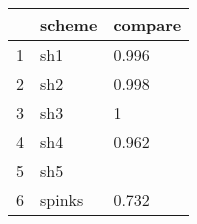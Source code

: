 \begin{table}[ht]
\centering
\begin{tabular}{rll}
  \hline
 & scheme & compare \\ 
  \hline
1 & sh1 & 0.996 \\ 
  2 & sh2 & 0.998 \\ 
  3 & sh3 & 1 \\ 
  4 & sh4 & 0.962 \\ 
  5 & sh5 &  \\ 
  6 & spinks & 0.732 \\ 
   \hline
\end{tabular}
\label{lldif}
\end{table}
